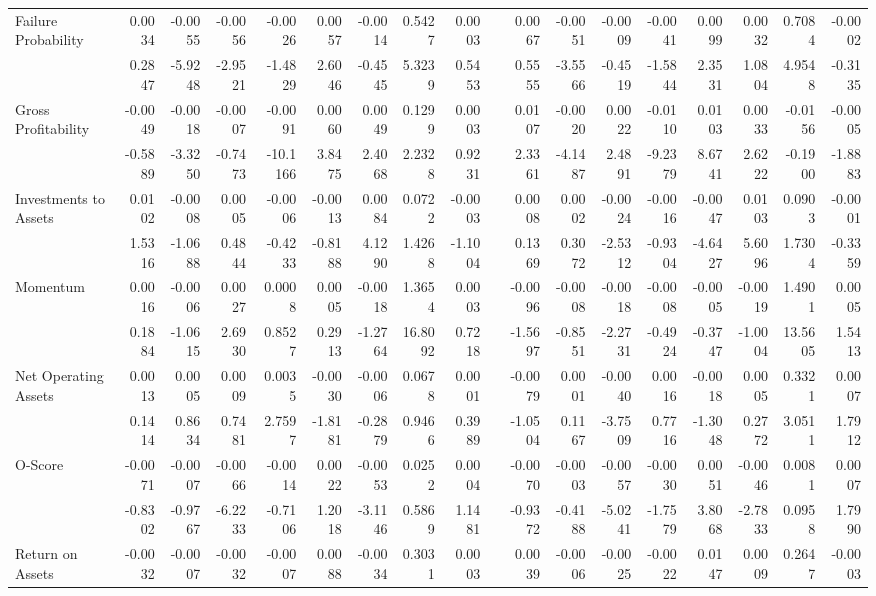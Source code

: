 \begin{sidewaystable}[htbp]
{\begin{tabular}{lrrrrrrrrrrrrrrrrr}
Failure Probability & 0.0034 & -0.0055 & -0.0056 & -0.0026 & 0.0057 & -0.0014 & 0.5427 & 0.0003 &       & 0.0067 & -0.0051 & -0.0009 & -0.0041 & 0.0099 & 0.0032 & 0.7084 & -0.0002 \\
& 0.2847 & -5.9248 & -2.9521 & -1.4829 & 2.6046 & -0.4545 & 5.3239 & 0.5453 &       & 0.5555 & -3.5566 & -0.4519 & -1.5844 & 2.3531 & 1.0804 & 4.9548 & -0.3135 \\
Gross Profitability & -0.0049 & -0.0018 & -0.0007 & -0.0091 & 0.0060 & 0.0049 & 0.1299 & 0.0003 &       & 0.0107 & -0.0020 & 0.0022 & -0.0110 & 0.0103 & 0.0033 & -0.0156 & -0.0005 \\
& -0.5889 & -3.3250 & -0.7473 & -10.1166 & 3.8475 & 2.4068 & 2.2328 & 0.9231 &       & 2.3361 & -4.1487 & 2.4891 & -9.2379 & 8.6741 & 2.6222 & -0.1900 & -1.8883 \\
Investments to Assets & 0.0102 & -0.0008 & 0.0005 & -0.0006 & -0.0013 & 0.0084 & 0.0722 & -0.0003 &       & 0.0008 & 0.0002 & -0.0024 & -0.0016 & -0.0047 & 0.0103 & 0.0903 & -0.0001 \\
& 1.5316 & -1.0688 & 0.4844 & -0.4233 & -0.8188 & 4.1290 & 1.4268 & -1.1004 &       & 0.1369 & 0.3072 & -2.5312 & -0.9304 & -4.6427 & 5.6096 & 1.7304 & -0.3359 \\
Momentum & 0.0016 & -0.0006 & 0.0027 & 0.0008 & 0.0005 & -0.0018 & 1.3654 & 0.0003 &       & -0.0096 & -0.0008 & -0.0018 & -0.0008 & -0.0005 & -0.0019 & 1.4901 & 0.0005 \\
& 0.1884 & -1.0615 & 2.6930 & 0.8527 & 0.2913 & -1.2764 & 16.8092 & 0.7218 &       & -1.5697 & -0.8551 & -2.2731 & -0.4924 & -0.3747 & -1.0004 & 13.5605 & 1.5413 \\
Net Operating Assets & 0.0013 & 0.0005 & 0.0009 & 0.0035 & -0.0030 & -0.0006 & 0.0678 & 0.0001 &       & -0.0079 & 0.0001 & -0.0040 & 0.0016 & -0.0018 & 0.0005 & 0.3321 & 0.0007 \\
& 0.1414 & 0.8634 & 0.7481 & 2.7597 & -1.8181 & -0.2879 & 0.9466 & 0.3989 &       & -1.0504 & 0.1167 & -3.7509 & 0.7716 & -1.3048 & 0.2772 & 3.0511 & 1.7912 \\
O-Score & -0.0071 & -0.0007 & -0.0066 & -0.0014 & 0.0022 & -0.0053 & 0.0252 & 0.0004 &       & -0.0070 & -0.0003 & -0.0057 & -0.0030 & 0.0051 & -0.0046 & 0.0081 & 0.0007 \\
& -0.8302 & -0.9767 & -6.2233 & -0.7106 & 1.2018 & -3.1146 & 0.5869 & 1.1481 &       & -0.9372 & -0.4188 & -5.0241 & -1.7579 & 3.8068 & -2.7833 & 0.0958 & 1.7990 \\
Return on Assets & -0.0032 & -0.0007 & -0.0032 & -0.0007 & 0.0088 & -0.0034 & 0.3031 & 0.0003 &       & 0.0039 & -0.0006 & -0.0025 & -0.0022 & 0.0147 & 0.0009 & 0.2647 & -0.0003 \\

\end{tabular}}
\end{sidewaystable}

